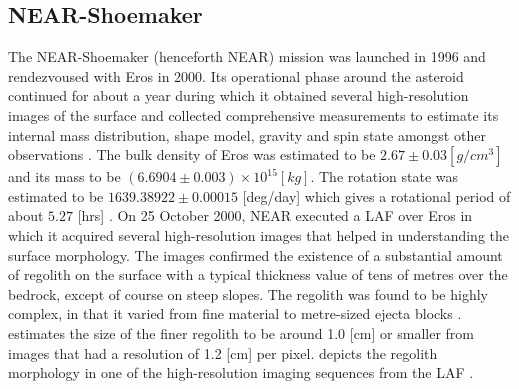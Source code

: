 \subsection{NEAR-Shoemaker}
\label{subsec:near_heritage}
The \gls{NEAR}-Shoemaker (henceforth \gls{NEAR}) mission was launched in 1996 and rendezvoused with Eros in 2000. Its operational phase around the asteroid continued for about a year during which it obtained several high-resolution images of the surface and collected comprehensive measurements to estimate its internal mass distribution, shape model, gravity and spin state amongst other observations \parencite{scheeresBook}. The bulk density of Eros was estimated to be $2.67 \pm 0.03 [g/cm^3]$ and its mass to be $(6.6904 \pm 0.003) \times 10^{15} [kg]$. The rotation state was estimated to be $1639.38922 \pm 0.00015$ [deg/day] which gives a rotational period of about $5.27$ [hrs] \parencite{erosShapeDetermination}. On 25 October 2000, \gls{NEAR} executed a \gls{LAF} over Eros in which it acquired several high-resolution images that helped in understanding the surface morphology. The images confirmed the existence of a substantial amount of regolith on the surface with a typical thickness value of tens of metres over the bedrock, except of course on steep slopes. The regolith was found to be highly complex, in that it varied from fine material to metre-sized ejecta blocks \parencite{Veverka2001}. \cite{Robinson2001} estimates the size of the finer regolith to be around 1.0 [cm] or smaller from images that had a resolution of 1.2 [cm] per pixel.  depicts the regolith morphology in one of the high-resolution imaging sequences from the \gls{LAF} \parencite{veverka2001landing}.

